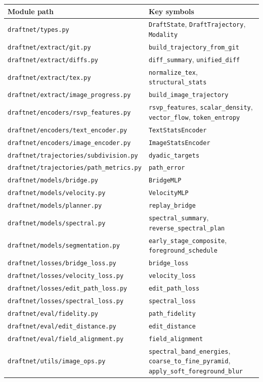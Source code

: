 \documentclass[12pt,a4paper]{article}
\theoremstyle{draftthm}
\newcommand{\code}[1]{\texttt{\small #1}}
\begin{document}
\begin{center}
\begin{tabular}{ll}
\toprule
Module path & Key symbols \\
\midrule
\code{draftnet/types.py} & \code{DraftState}, \code{DraftTrajectory}, \code{Modality} \\
\code{draftnet/extract/git.py} & \code{build\_trajectory\_from\_git} \\
\code{draftnet/extract/diffs.py} & \code{diff\_summary}, \code{unified\_diff} \\
\code{draftnet/extract/tex.py} & \code{normalize\_tex}, \code{structural\_stats} \\
\code{draftnet/extract/image\_progress.py} & \code{build\_image\_trajectory} \\
\code{draftnet/encoders/rsvp\_features.py} & \code{rsvp\_features}, \code{scalar\_density}, \code{vector\_flow}, \code{token\_entropy} \\
\code{draftnet/encoders/text\_encoder.py} & \code{TextStatsEncoder} \\
\code{draftnet/encoders/image\_encoder.py} & \code{ImageStatsEncoder} \\
\code{draftnet/trajectories/subdivision.py} & \code{dyadic\_targets} \\
\code{draftnet/trajectories/path\_metrics.py} & \code{path\_error} \\
\code{draftnet/models/bridge.py} & \code{BridgeMLP} \\
\code{draftnet/models/velocity.py} & \code{VelocityMLP} \\
\code{draftnet/models/planner.py} & \code{replay\_bridge} \\
\code{draftnet/models/spectral.py} & \code{spectral\_summary}, \code{reverse\_spectral\_plan} \\
\code{draftnet/models/segmentation.py} & \code{early\_stage\_composite}, \code{foreground\_schedule} \\
\code{draftnet/losses/bridge\_loss.py} & \code{bridge\_loss} \\
\code{draftnet/losses/velocity\_loss.py} & \code{velocity\_loss} \\
\code{draftnet/losses/edit\_path\_loss.py} & \code{edit\_path\_loss} \\
\code{draftnet/losses/spectral\_loss.py} & \code{spectral\_loss} \\
\code{draftnet/eval/fidelity.py} & \code{path\_fidelity} \\
\code{draftnet/eval/edit\_distance.py} & \code{edit\_distance} \\
\code{draftnet/eval/field\_alignment.py} & \code{field\_alignment} \\
\code{draftnet/utils/image\_ops.py} & \code{spectral\_band\_energies}, \code{coarse\_to\_fine\_pyramid}, \code{apply\_soft\_foreground\_blur} \\
\bottomrule
\end{tabular}
\end{center}
\end{document}
